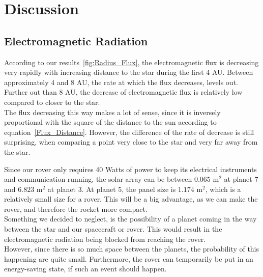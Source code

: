 \documentclass[reprint,english,notitlepage]{revtex4-2}
\begin{document}
\section{Discussion} \label{sec:discussion}
	\subsection{Electromagnetic Radiation}\label{subsec:disc_radiation}
	According to our results~\ref{fig:Radius_Flux}, the electromagnetic flux is decreasing very rapidly with increasing distance to the star during the first 4 AU.
	Between approximately 4 and 8 AU, the rate at which the flux decreases, levels out.
	Further out than 8 AU, the decrease of electromagnetic flux is relatively low compared to closer to the star.\\
	The flux decreasing this way makes a lot of sense, since it is inversely proportional with the square of the distance to the sun according to equation~\eqref{Flux_Distance}.
	However, the difference of the rate of decrease is still surprising, when comparing a point very close to the star and very far away from the star.

	Since our rover only requires 40 Watts of power to keep its electrical instruments and communication running, the solar array can be between $0.065$ m$^2$ at planet 7 and $6.823$ m$^2$ at planet 3.
	At planet 5, the panel size is $1.174$ m$^2$, which is a relatively small size for a rover.
	This will be a big advantage, as we can make the rover, and therefore the rocket more compact.\\
	Something we decided to neglect, is the possibility of a planet coming in the way between the star and our spacecraft or rover.
	This would result in the electromagnetic radiation being blocked from reaching the rover.\\
	However, since there is so much space between the planets, the probability of this happening are quite small.
	Furthermore, the rover can temporarily be put in an energy-saving state, if such an event should happen.\\
\end{document}
